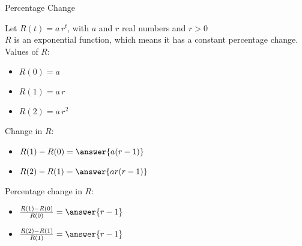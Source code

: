 \documentclass{ximera}
\begin{document}
\begin{example} Percentage Change



Let $R(t) = a \, r^t$, with $a$ and $r$ real numbers and $r>0$ \\

$R$ is an exponential function, which means it has a constant percentage change. \\

Values of $R$:

\begin{itemize}
\item $R(0) = a$

\item $R(1) = a \, r$

\item $R(2) = a \, r^2$
\end{itemize}



Change in $R$:

\begin{itemize}
\item $R(1) - R(0) = \answer{a (r-1)}$

\item $R(2) - R(1) = \answer{a r (r-1)}$

\end{itemize}





Percentage change in $R$:

\begin{itemize}
\item $\frac{R(1) - R(0)}{R(0)} = \answer{r-1}$

\item $\frac{R(2) - R(1)}{R(1)} = \answer{r-1}$

\end{itemize}


\end{example}
\end{document}
